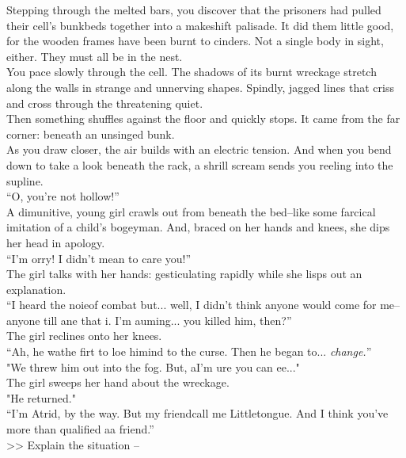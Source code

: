 Stepping through the melted bars, you discover that the prisoners had pulled their cell’s bunkbeds together into a makeshift palisade. It did them little good, for the wooden frames have been burnt to cinders. Not a single body in sight, either. They must all be in the nest.\\

You pace slowly through the cell. The shadows of its burnt wreckage stretch along the walls in strange and unnerving shapes. Spindly, jagged lines that criss and cross through the threatening quiet.\\

Then something shuffles against the floor and quickly stops. It came from the far corner: beneath an unsinged bunk.\\

As you draw closer, the air builds with an electric tension. And when you bend down to take a look beneath the rack, a shrill scream sends you reeling into the supline.\\

“O, you’re not hollow!”\\

A dimunitive, young girl crawls out from beneath the bed--like some farcical imitation of a child’s bogeyman. And, braced on her hands and knees, she dips her head in apology.\\

“I’m \lisp orry! I didn’t mean to \lisp care you!”\\

The girl talks with her hands: gesticulating rapidly while she lisps out an explanation.\\

“I heard the noi\lisp e\lispx of combat but... well, I didn’t think anyone would come for me--anyone \lisp till \lisp ane that i\lisp . I’m a\lisp uming... you killed him, then?”\\

The girl reclines onto her knees.\\
“Ah, he wa\lispx the fir\lisp t to lo\lisp e hi\lispx mind to the curse. Then he began to... \emph{change.}”\\

"We threw him out into the fog. But, a\lispx I'm \lisp ure you can \lisp ee..."\\

The girl sweeps her hand about the wreckage.\\
"He returned."\\

“I’m A\lisp trid, by the way. But my friend\lispx call me Littletongue. And I think you’ve more than qualified a\lispx a friend.”\\

>> Explain the situation -- 